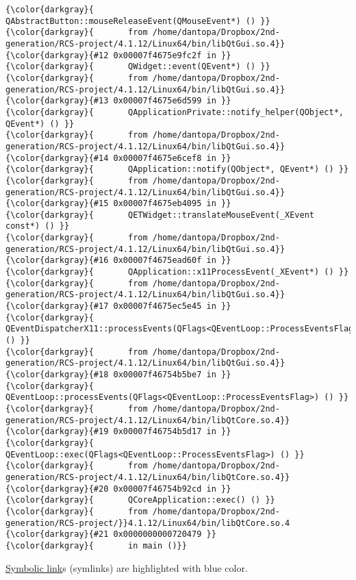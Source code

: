 {{\begin{Verbatim}[commandchars=\\\{\}]
{\color{darkgray}{       QAbstractButton::mouseReleaseEvent(QMouseEvent*) () }}
{\color{darkgray}{       from /home/dantopa/Dropbox/2nd-generation/RCS-project/4.1.12/Linux64/bin/libQtGui.so.4}}
{\color{darkgray}{#12 0x00007f4675e9fc2f in }}
{\color{darkgray}{       QWidget::event(QEvent*) () }}
{\color{darkgray}{       from /home/dantopa/Dropbox/2nd-generation/RCS-project/4.1.12/Linux64/bin/libQtGui.so.4}}
{\color{darkgray}{#13 0x00007f4675e6d599 in }}
{\color{darkgray}{       QApplicationPrivate::notify_helper(QObject*, QEvent*) () }}
{\color{darkgray}{       from /home/dantopa/Dropbox/2nd-generation/RCS-project/4.1.12/Linux64/bin/libQtGui.so.4}}
{\color{darkgray}{#14 0x00007f4675e6cef8 in }}
{\color{darkgray}{       QApplication::notify(QObject*, QEvent*) () }}
{\color{darkgray}{       from /home/dantopa/Dropbox/2nd-generation/RCS-project/4.1.12/Linux64/bin/libQtGui.so.4}}
{\color{darkgray}{#15 0x00007f4675eb4095 in }}
{\color{darkgray}{       QETWidget::translateMouseEvent(_XEvent const*) () }}
{\color{darkgray}{       from /home/dantopa/Dropbox/2nd-generation/RCS-project/4.1.12/Linux64/bin/libQtGui.so.4}}
{\color{darkgray}{#16 0x00007f4675ead60f in }}
{\color{darkgray}{       QApplication::x11ProcessEvent(_XEvent*) () }}
{\color{darkgray}{       from /home/dantopa/Dropbox/2nd-generation/RCS-project/4.1.12/Linux64/bin/libQtGui.so.4}}
{\color{darkgray}{#17 0x00007f4675ec5e45 in }}
{\color{darkgray}{       QEventDispatcherX11::processEvents(QFlags<QEventLoop::ProcessEventsFlag>) () }}
{\color{darkgray}{       from /home/dantopa/Dropbox/2nd-generation/RCS-project/4.1.12/Linux64/bin/libQtGui.so.4}}
{\color{darkgray}{#18 0x00007f46754b5be7 in }}
{\color{darkgray}{       QEventLoop::processEvents(QFlags<QEventLoop::ProcessEventsFlag>) () }}
{\color{darkgray}{       from /home/dantopa/Dropbox/2nd-generation/RCS-project/4.1.12/Linux64/bin/libQtCore.so.4}}
{\color{darkgray}{#19 0x00007f46754b5d17 in }}
{\color{darkgray}{       QEventLoop::exec(QFlags<QEventLoop::ProcessEventsFlag>) () }}
{\color{darkgray}{       from /home/dantopa/Dropbox/2nd-generation/RCS-project/4.1.12/Linux64/bin/libQtCore.so.4}}
{\color{darkgray}{#20 0x00007f46754b92cd in }}
{\color{darkgray}{       QCoreApplication::exec() () }}
{\color{darkgray}{       from /home/dantopa/Dropbox/2nd-generation/RCS-project/}}4.1.12/Linux64/bin/libQtCore.so.4
{\color{darkgray}{#21 0x0000000000720479 }}
{\color{darkgray}{       in main ()}}
\end{Verbatim}
}}
\href{https://en.wikipedia.org/wiki/Symbolic_link}{Symbolic link}s (symlinks) are highlighted with blue color.

\endinput  %
